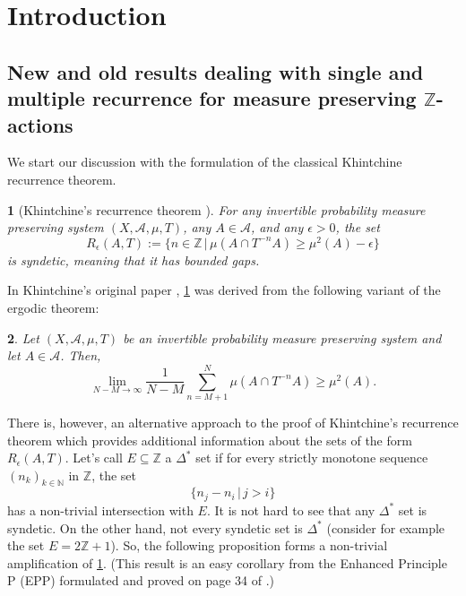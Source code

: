 \documentclass[11pt,american,preprint]{elsarticle}
\numberwithin{equation}{section}
\theoremstyle{plain}
\newtheorem{thm}{\protect\theoremname}[section]
\theoremstyle{plain*}
\theoremstyle{plain}
\theoremstyle{plain*}
\theoremstyle{plain}
\theoremstyle{plain*}
\theoremstyle{remark}
\theoremstyle{remark*}
\theoremstyle{remark}
\theoremstyle{remark*}
\theoremstyle{remark}
\theoremstyle{remark*}
\theoremstyle{plain}
\theoremstyle{definition}
\theoremstyle{plain}
\theoremstyle{plain} %
\providecommand{\theoremname}{Theorem}
\newcommand{\N}{\mathbb{N}}
\newcommand{\Z}{\mathbb{Z}}
\begin{document}
\maketitle

\tableofcontents

\section{Introduction}
\subsection{New and old results dealing with single and multiple recurrence for measure preserving $\Z$-actions} 
We start our discussion with the formulation of the classical  Khintchine recurrence theorem.
\begin{thm}[Khintchine's recurrence theorem \cite{KhintchineRec1935}]\label{0.KhintchineRecThm}
For any invertible probability measure preserving system $(X,\mathcal A,\mu,T)$, any $A\in\mathcal A$, and any $\epsilon>0$, the set 
\begin{equation}
    R_\epsilon(A,T):=\{n\in\Z\,|\,\mu(A\cap T^{-n}A)\geq \mu^2(A)-\epsilon\}
\end{equation}
is syndetic, meaning that it has bounded gaps.     
\end{thm}
In  Khintchine's original paper \cite{KhintchineRec1935}, \cref{0.KhintchineRecThm}  was derived from the following variant of the ergodic theorem:
\begin{thm}\label{0.thm:khintchineLimitingFormula}
Let $(X,\mathcal A,\mu,T)$ be an invertible probability measure preserving system and let $A\in\mathcal A$. Then, 
\begin{equation}
    \lim_{N-M\rightarrow\infty}\frac{1}{N-M}\sum_{n=M+1}^N\mu(A\cap T^{-n}A)\geq \mu^2(A).
\end{equation}
\end{thm}
There is, however, an alternative approach to the proof of Khintchine's recurrence theorem which provides additional information about the sets of the form $R_\epsilon(A,T)$.
Let's call $E\subseteq \Z$  a $\Delta^*$ set if for every strictly monotone  sequence $(n_k)_{k\in\N}$ in $\Z$, the set 
$$\{n_j-n_i\,|\,j>i\}$$
has a non-trivial intersection with $E$. It is not hard to see that any $\Delta^*$ set is syndetic. On the other hand, not every syndetic set is $\Delta^*$ (consider for example the set $E=2\Z+1$). So, the following proposition forms a non-trivial amplification of \cref{0.KhintchineRecThm}. (This result is an easy corollary from the Enhanced  Principle P (EPP) formulated and proved on page 34 of \cite{MultifariousPoincare}.) 
\end{document}
